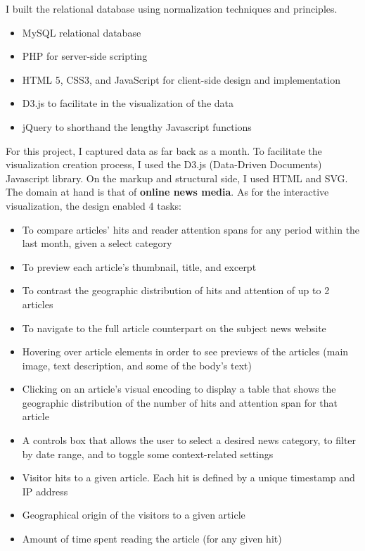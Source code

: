 \documentclass[12pt]{article}
\begin{document}
I built the relational database using normalization techniques and principles.

\begin{itemize}
\item MySQL relational database
\item PHP for server-side scripting
\item HTML 5, CSS3, and JavaScript for client-side design and implementation
\item D3.js to facilitate in the visualization of the data
\item jQuery to shorthand the lengthy Javascript functions
\end{itemize}

For this project, I captured data as far back as a month. To facilitate the visualization creation process, I used the D3.js (Data-Driven Documents) Javascript library. On the markup and structural side, I used HTML and SVG. The domain at hand is that of \textbf{online news media}. As for the interactive visualization, the design enabled 4 tasks:
\begin{itemize}
\item To compare articles' hits and reader attention spans for any period within the last month, given a select category
\item To preview each article's thumbnail, title, and excerpt
\item To contrast the geographic distribution of hits and attention of up to 2 articles
\item To navigate to the full article counterpart on the subject news website
\end{itemize}


\begin{itemize}
\item Hovering over article elements in order to see previews of the articles (main image, text description, and some of the body's text)
\item Clicking on an article's visual encoding to display a table that shows the geographic distribution of the number of hits and attention span for that article
\item A controls box that allows the user to select a desired news category, to filter by date range, and to toggle some context-related settings 
\end{itemize}

\begin{itemize}
\item Visitor hits to a given article. Each hit is defined by a unique timestamp and IP address
\item Geographical origin of the visitors to a given article
\item Amount of time spent reading the article (for any given hit)


\end{itemize}
\end{document}
